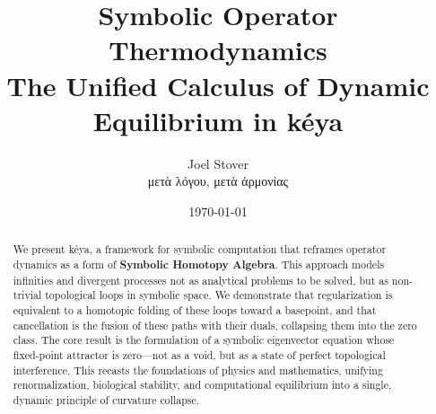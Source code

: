 \documentclass[10pt]{article}
\title{\bfseries Symbolic Operator Thermodynamics\\ \large 
The Unified Calculus of Dynamic Equilibrium in kéya}
\author{Joel Stover \\ \small \textgreek{μετὰ λόγου, μετὰ ἁρμονίας}}
\date{\today}
\theoremstyle{definition}
\begin{document}
\maketitle

\begin{abstract}
We present k\'{e}ya, a framework for symbolic computation that reframes operator dynamics as a form of \textbf{Symbolic Homotopy Algebra}. This approach models infinities and divergent processes not as analytical problems to be solved, but as non-trivial topological loops in symbolic space. We demonstrate that regularization is equivalent to a homotopic folding of these loops toward a basepoint, and that cancellation is the fusion of these paths with their duals, collapsing them into the zero class. The core result is the formulation of a symbolic eigenvector equation whose fixed-point attractor is zero---not as a void, but as a state of perfect topological interference. This recasts the foundations of physics and mathematics, unifying renormalization, biological stability, and computational equilibrium into a single, dynamic principle of curvature collapse.
\end{abstract}

\tableofcontents







\end{document}
